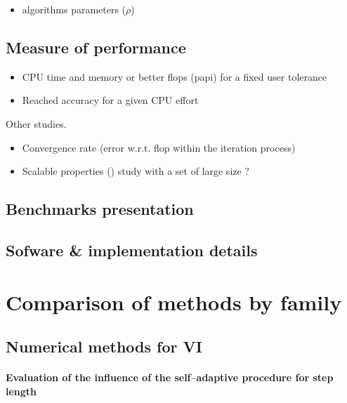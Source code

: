 \begin{itemize}
\item algorithms parameters ($\rho$)
\end{itemize}


\subsection{Measure of performance}
\begin{itemize}
\item CPU time and memory or better flops (papi) for a fixed user tolerance
\item Reached accuracy for a given CPU effort
\end{itemize}
Other studies.
\begin{itemize}
\item Convergence rate (error w.r.t. flop within the iteration process)
\item Scalable properties () study with a set of large size ?
\end{itemize}

\subsection{Benchmarks presentation}

\subsection{Sofware \& implementation details}
\clearpage


\section{Comparison of methods by family}

\subsection{Numerical methods for VI}

\def\performance{flpops}
\def\widthfigure{0.6}
\paragraph{Evaluation of the influence of the self--adaptive procedure for step length}
\label{Sec:Comparison,VI,step-length}


